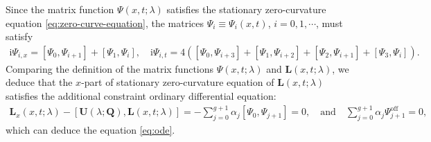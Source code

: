 \documentclass[11pt,reqno]{amsart}
\newcommand{\ii}{\mathrm{i}}
\newcommand{\off}{\mathrm{off}}
\numberwithin{equation}{section}
\begin{document}
\newenvironment{proof-prop-matrix-L}{\emph{\textbf{Proof of the \Cref{prop:L-matrix}.}}}{\hfill$\Box$\medskip}
	\begin{proof-prop-matrix-L}
	Since the matrix function $\Psi(x,t;\lambda)$ satisfies the stationary zero-curvature equation \eqref{eq:zero-curve-equation}, the matrices $\Psi_i\equiv\Psi_i(x,t)$, $i=0,1,\cdots$, must satisfy
	\begin{equation}\label{eq:define-Psi-x}
		\begin{split}
			 \ii \Psi_{i,x}= \left[\Psi_{0}, \Psi_{i+1}\right]+ \left[\Psi_{1},\Psi_{i}\right], \quad
			 \ii \Psi_{i,t}=4 \left(\left[\Psi_{0}, \Psi_{i+3}\right]+ \left[\Psi_{1},\Psi_{i+2}\right] + \left[ \Psi_2, \Psi_{i+1}\right] + \left[\Psi_3,\Psi_{i}\right]\right).
		\end{split}
	\end{equation}
	Comparing the definition of the matrix functions $\Psi(x,t;\lambda)$ and $\mathbf{L}(x,t;\lambda)$, we deduce that the $x$-part of stationary zero-curvature equation of $\mathbf{L}(x,t;\lambda)$ satisfies the additional constraint ordinary differential equation:
	\begin{equation}\label{eq:define-x}
		\begin{split}
			\mathbf{L}_x(x,t;\lambda)-[\mathbf{U}(\lambda;\mathbf{Q}),\mathbf{L}(x,t;\lambda)]=-\sum_{j=0}^{g+1}\alpha_j\left[\Psi_0,\Psi_{j+1}\right]=0, \quad \text{and} \quad \sum_{j=0}^{g+1} \alpha_j \Psi_{j+1}^{\off}=0,
		\end{split}
	\end{equation}
	which can deduce the equation \eqref{eq:ode}. 
		

\end{proof-prop-matrix-L}
\end{document}
